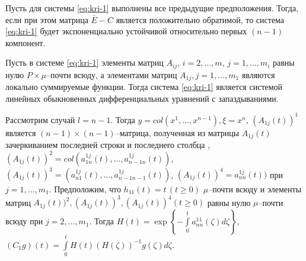 \begin{statement}\label{st:kri-1}
    Пусть для системы \eqref{eq:kri-1} выполнены все
    предыдущие предположения. Тогда, если при этом матрица $\bar E - C$
    является положительно обратимой, то система \eqref{eq:kri-1} будет
    экспоненциально устойчивой относительно первых $(n-1)$ компонент.
\end{statement}

Пусть в системе \eqref{eq:kri-1} элементы матриц $A_{ij}$, $i = 2, \dots, m$, $j = 1, \dots, m_i$ равны нулю $P\times\mu$--почти всюду, а элементами матриц
$A_{1j}, j = 1, \dots, m_1$ являются локально суммируемые функции.
Тогда система \eqref{eq:kri-1} является системой линейных обыкновенных
дифференциальных уравнений с запаздываниями.

Рассмотрим случай  $l = n-1$. Тогда $y = col(x^1,\dots,x^{n-1}), \xi =
x^n$, $(A_{1j}(t))^1$ является $(n-1)\times (n-1)$--матрица,
полученная из матрицы $A_{1j}(t)$ зачеркиванием последней строки и
последнего столбца , $(A_{1j}(t))^2 =
col(a^{1j}_{1n}(t),\dots,a^{1j}_{n-1 n}(t))$, $(A_{1j}(t))^3 =
(a^{1j}_{n1}(t),\dots,a^{1j}_{n-1n-1}(t))$, $(A_{1j}(t))^4 =
a^{1j}_{nn}(t))$ при $j = 1,\dots,m_1 $. Предположим, что $h_{11}(t) =
t \, (t \geq 0)$ $\mu $--почти всюду и элементы матриц
$A_{1j}(t))^2, (A_{1j}(t))^3, (A_{1j}(t))^4 (t \geq 0)$ равны нулю
$\mu $--почти всюду при $j = 2,\dots,m_1 $. Тогда $H(t) = \exp \left
\{-\int \limits _{0}^t a^{11}_{nn}(\zeta)d\zeta \right \}$,
$(C_1g)(t) = \int \limits _{0}^tH(t)(H(\zeta))^{-1}g(\zeta)d\zeta$.

